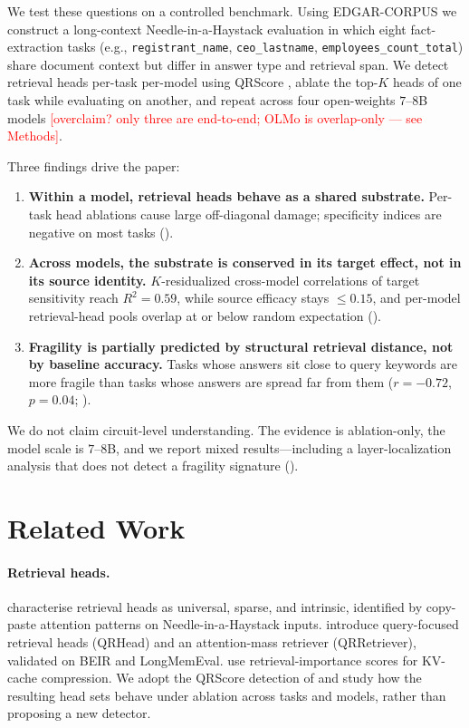 \documentclass{article}
\newcommand{\taskpill}[1]{\colorbox{gray!15}{\texttt{\small #1}}}
\theoremstyle{plain}
\theoremstyle{definition}
\theoremstyle{remark}
\begin{document}
We test these questions on a controlled benchmark. Using EDGAR-CORPUS \citep{loukas2021edgar} we construct a long-context Needle-in-a-Haystack evaluation in which eight fact-extraction tasks (e.g., \taskpill{registrant\_name}, \taskpill{ceo\_lastname}, \taskpill{employees\_count\_total}) share document context but differ in answer type and retrieval span. We detect retrieval heads per-task per-model using QRScore \citep{zhang2025qrhead}, ablate the top-$K$ heads of one task while evaluating on another, and repeat across four open-weights $7$--$8$B models\textcolor{red}{ [overclaim? only three are end-to-end; OLMo is overlap-only --- see Methods]}.

Three findings drive the paper:
\begin{enumerate}
\itemsep0pt
\item \textbf{Within a model, retrieval heads behave as a shared substrate.} Per-task head ablations cause large off-diagonal damage; specificity indices are negative on most tasks ().
\item \textbf{Across models, the substrate is conserved in its target effect, not in its source identity.} $K$-residualized cross-model correlations of target sensitivity reach $R^2{=}0.59$, while source efficacy stays $\leq 0.15$, and per-model retrieval-head pools overlap at or below random expectation ().
\item \textbf{Fragility is partially predicted by structural retrieval distance, not by baseline accuracy.} Tasks whose answers sit close to query keywords are more fragile than tasks whose answers are spread far from them ($r{=}{-}0.72$, $p{=}0.04$; ).
\end{enumerate}

We do not claim circuit-level understanding. The evidence is ablation-only, the model scale is $7$--$8$B, and we report mixed results---including a layer-localization analysis that does not detect a fragility signature ().

\section{Related Work}

\paragraph{Retrieval heads.} \citet{wu2024retrieval} characterise retrieval heads as universal, sparse, and intrinsic, identified by copy-paste attention patterns on Needle-in-a-Haystack inputs. \citet{zhang2025qrhead} introduce query-focused retrieval heads (QRHead) and an attention-mass retriever (QRRetriever), validated on BEIR and LongMemEval. \citet{fu2024headkv} use retrieval-importance scores for KV-cache compression. We adopt the QRScore detection of \citet{zhang2025qrhead} and study how the resulting head sets behave under ablation across tasks and models, rather than proposing a new detector.
\end{document}
